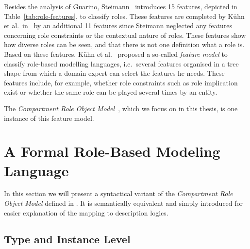 Besides the analysis of Guarino, Steimann~\cite{Stei-DKE00} introduces 15 features, depicted in
Table~\ref{tab:role-features}, to classify roles. These features are completed by Kühn et al.\
in~\cite{KuLG-SLE14} by an additional 11 features since Steimann neglected any features concerning
role constraints or the contextual nature of roles.  These features show how diverse roles can be
seen, and that there is not one definition what a role is. Based on these features, Kühn et
al.~\cite{KuLG-SLE14} proposed a so-called \emph{feature model} to classify role-based modelling
languages, i.e.\ several features organised in a tree shape from which a domain expert can select
the features he needs. These features include, for example, whether role constraints such as role
implication exist or whether the same role can be played several times by an entity.

The \emph{Compartment Role Object Model}~\cite{KBG-SLE15}, which we focus on in this thesis, is one
instance of this feature model.

\section{A Formal Role-Based Modeling Language}
\label{sec:sigma-crom}

In this section we will present a syntactical variant of the \emph{Compartment Role Object Model}
defined in \cite{KBG-SLE15}. It is semantically equivalent and simply introduced for easier
explanation of the mapping to description logics.

\subsection{Type and Instance Level}
\label{sec:type-instance-level}

